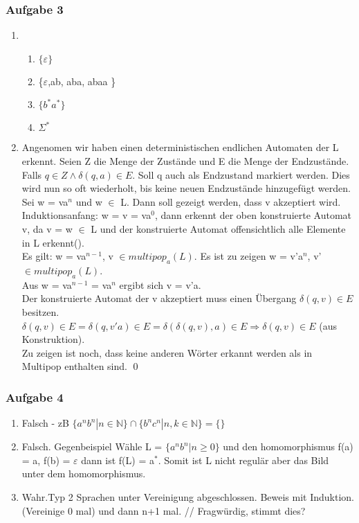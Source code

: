 \documentclass[12pt]{scrartcl}
\begin{document}
\subsubsection{Aufgabe 3}
	\begin{enumerate}
		\item 
		\begin{enumerate}
			\item \(\{\varepsilon\}\)
			\item \{$\varepsilon$,ab, aba, abaa \}
			\item \(\{ b^{*}a^{*}\}\)
			\item \( \Sigma^{*}\)
		\end{enumerate}
		\item Angenomen wir haben einen deterministischen endlichen Automaten der L erkennt. Seien Z die Menge der Zustände und E die Menge der Endzustände. Falls \( q \in Z \land \delta(q,a) \in E  \). Soll q auch als Endzustand markiert werden. Dies wird nun so oft wiederholt, bis keine neuen Endzustände hinzugefügt werden.\\
		Sei w = va$^{n}$ und w $\in$ L.  Dann soll gezeigt werden, dass v akzeptiert wird.  \\ 
		
		Induktionsanfang: w = v = va$^{0}$, dann erkennt der oben konstruierte Automat v, da v = w $\in$ L und der konstruierte Automat offensichtlich alle Elemente in L erkennt().\\ 
		
		Es gilt: w = va$^{n-1}$, v \(\in multipop_a(L)\). Es ist zu zeigen w = v'a$^{n}$, v'\(\in multipop_a(L)\). \\ 
		Aus w = va$^{n-1}$ = va$^{n}$ ergibt sich v = v'a. \\ Der konstruierte Automat der v akzeptiert muss einen Übergang \( \delta(q, v) \in E \) besitzen. \(\delta(q, v) \in E =\delta(q, v'a) \in E = \delta(\delta(q,v), a) \in E \Rightarrow \delta(q,v) \in E\) (aus Konstruktion).\\
		
		Zu zeigen ist noch, dass keine anderen Wörter erkannt werden als in Multipop enthalten sind.
		\qed	
	\end{enumerate}

\subsubsection{Aufgabe 4}
	\begin{enumerate}
		\item Falsch - zB \(\{a^{n}b^{n}|n \in \mathbb{N}\} \cap \{b^{n}c^{n}|n,k \in \mathbb{N}\} = \{ \}\)
		\item Falsch. Gegenbeispiel Wähle L = \(\{ a^{n}b^{n} | n \ge 0 \}\) und den homomorphismus f(a) = a, f(b) = $\varepsilon$ dann ist f(L) = a$^{*}$. Somit ist L nicht regulär aber das Bild unter dem homomorphismus. 
		\item Wahr.Typ 2 Sprachen unter Vereinigung abgeschlossen. Beweis mit Induktion. (Vereinige 0 mal) und dann n+1 mal. // Fragwürdig, stimmt dies? 
	\end{enumerate}
	
\end{document}
